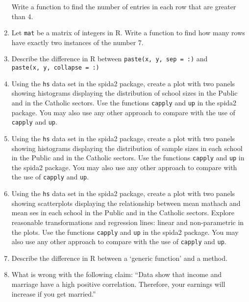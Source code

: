 \documentclass[
]{article}
\begin{document}
\begin{enumerate}
  Write a function to find the number of entries in each row that are
  greater than 4. \vspace{0px}
\item
  Let \texttt{mat} be a matrix of integers in R. Write a function to
  find how many rows have exactly two instances of the number 7.
  \vspace{0px}
\item
  Describe the difference in R between
  \texttt{paste(x,\ y,\ sep\ =\ \textquotesingle{}:\textquotesingle{})}
  and
  \texttt{paste(x,\ y,\ collapse\ =\ \textquotesingle{}:\textquotesingle{})}
  \vspace{0px}
\item
  Using the \texttt{hs} data set in the spida2 package, create a plot
  with two panels showing histograms displaying the distribution of
  school sizes in the Public and in the Catholic sectors. Use the
  functions \texttt{capply} and \texttt{up} in the spida2 package. You
  may also use any other approach to compare with the use of
  \texttt{capply} and \texttt{up}. \vspace{0px}
\item
  Using the \texttt{hs} data set in the spida2 package, create a plot
  with two panels showing histograms displaying the distribution of
  sample sizes in each school in the Public and in the Catholic sectors.
  Use the functions \texttt{capply} and \texttt{up} in the spida2
  package. You may also use any other approach to compare with the use
  of \texttt{capply} and \texttt{up}. \vspace{0px}
\item
  Using the \texttt{hs} data set in the spida2 package, create a plot
  with two panels showing scatterplots displaying the relationship
  between mean mathach and mean ses in each school in the Public and in
  the Catholic sectors. Explore reasonable transformations and
  regression lines: linear and non-parametric in the plots. Use the
  functions \texttt{capply} and \texttt{up} in the spida2 package. You
  may also use any other approach to compare with the use of
  \texttt{capply} and \texttt{up}. \vspace{0px}
\item
  Describe the difference in R between a `generic function' and a
  method. \vspace{0px}
\item
  What is wrong with the following claim: ``Data show that income and
  marriage have a high positive correlation. Therefore, your earnings
  will increase if you get married.'' \vspace{0px}

\end{enumerate}
\end{document}
